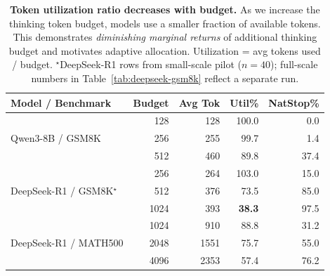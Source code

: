 \begin{table}[t]
\centering
\caption{\textbf{Token utilization ratio decreases with budget.}
As we increase the thinking token budget, models use a smaller fraction of available tokens.
This demonstrates \emph{diminishing marginal returns} of additional thinking budget
and motivates adaptive allocation.
Utilization = avg tokens used / budget.
$^{\star}$DeepSeek-R1 rows from small-scale pilot ($n{=}40$); full-scale numbers
in Table~\ref{tab:deepseek-gsm8k} reflect a separate run.}
\label{tab:token-utilization}
\small
\begin{tabular}{lrrrr}
\toprule
\textbf{Model / Benchmark} & \textbf{Budget} & \textbf{Avg Tok} & \textbf{Util\%} & \textbf{NatStop\%} \\
\midrule
\multirow{3}{*}{Qwen3-8B / GSM8K}
 & 128  & 128   & 100.0 &  0.0 \\
 & 256  & 255   &  99.7 &  1.4 \\
 & 512  & 460   &  89.8 & 37.4 \\
\midrule
\multirow{3}{*}{DeepSeek-R1 / GSM8K$^{\star}$}
 & 256  & 264   & 103.0 & 15.0 \\
 & 512  & 376   &  73.5 & 85.0 \\
 & 1024 & 393   &  \textbf{38.3} & 97.5 \\
\midrule
\multirow{3}{*}{DeepSeek-R1 / MATH500}
 & 1024 & 910   &  88.8 & 31.2 \\
 & 2048 & 1551  &  75.7 & 55.0 \\
 & 4096 & 2353  &  57.4 & 76.2 \\
\bottomrule
\end{tabular}
\vspace{-2mm}
\end{table}
